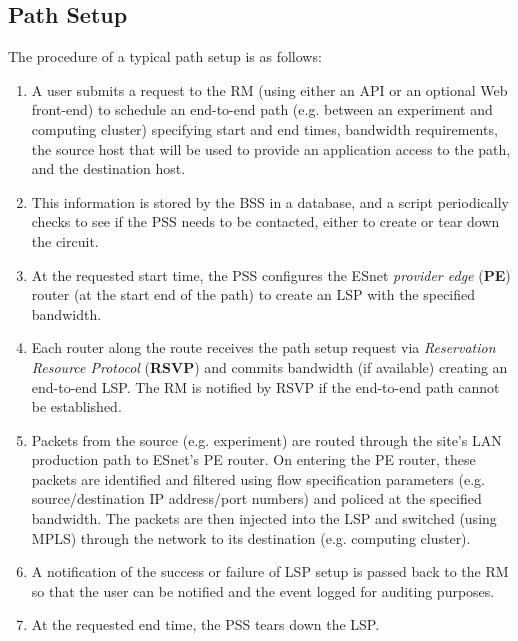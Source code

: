 \documentclass[conference]{IEEEtran}
\begin{document}
\subsection{Path Setup}

The procedure of a typical path setup is as follows:

\begin{enumerate}
\item
A user submits a request to the RM (using either an API or
an optional Web front-end) to schedule an end-to-end path (e.g. between an
experiment and computing cluster) specifying start and end times, bandwidth
requirements, the source host that will be used 
to provide an application access to the path, and the destination host.

\item
This information is stored by the BSS in a database, and a script 
periodically checks to see if the PSS needs to be contacted, either to create 
or tear down the circuit.

\item
At the requested start time, the PSS configures the 
ESnet \emph{provider edge} (\textbf{PE}) router
(at the start end of the path) to create an LSP with the
specified bandwidth.

\item
Each router along the route receives the path setup request 
via \emph{Reservation Resource Protocol} (\textbf{RSVP}) \cite{rsvp}
and commits bandwidth (if available) creating an end-to-end LSP.  The RM is
notified by RSVP if the end-to-end path cannot be established.

\item
Packets from the source (e.g. experiment) are routed through the site's
LAN production path to ESnet's PE router.  On entering the PE router,
these packets are identified and filtered using flow specification parameters
(e.g. source/destination IP address/port numbers) and policed at the specified
bandwidth.  The packets are then injected into the LSP and switched (using MPLS)
through the network to its destination (e.g. computing cluster).

\item
A notification of the success or failure of LSP setup is 
passed back to the RM so that the user can be notified and the event 
logged for auditing purposes.

\item
At the requested end time, the PSS tears down the LSP.
\end{enumerate}
\end{document}
